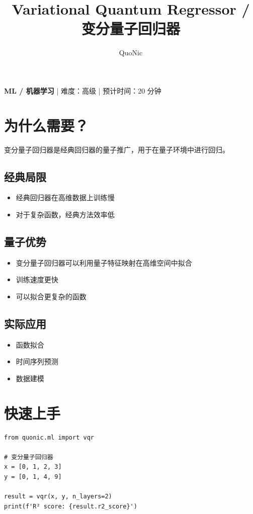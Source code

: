 \documentclass[12pt,a4paper]{article}
\title{Variational Quantum Regressor / 变分量子回归器}
\author{QuoNic}
\date{}
\begin{document}
\maketitle

\begin{center}
\textbf{ML / 机器学习} | 难度：高级 | 预计时间：20 分钟
\end{center}

\tableofcontents
\newpage

\section{为什么需要？}

变分量子回归器是经典回归器的量子推广，用于在量子环境中进行回归。

\subsection{经典局限}
\begin{itemize}
  \item 经典回归器在高维数据上训练慢
  \item 对于复杂函数，经典方法效率低
\end{itemize}

\subsection{量子优势}
\begin{itemize}
  \item 变分量子回归器可以利用量子特征映射在高维空间中拟合
  \item 训练速度更快
  \item 可以拟合更复杂的函数
\end{itemize}

\subsection{实际应用}
\begin{itemize}
  \item 函数拟合
  \item 时间序列预测
  \item 数据建模
\end{itemize}

\section{快速上手}

\begin{verbatim}
from quonic.ml import vqr

# 变分量子回归器
x = [0, 1, 2, 3]
y = [0, 1, 4, 9]

result = vqr(x, y, n_layers=2)
print(f'R² score: {result.r2_score}')
\end{verbatim}
\end{document}
